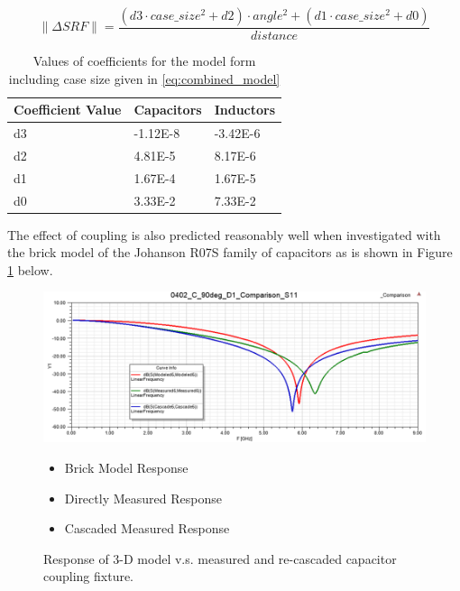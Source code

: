 \documentclass[12pt]{usfcoe}
\begin{document}
    \begin{equation}\label{eq:combined_model}
   \|\Delta SRF\| = \frac{\left( d3\cdot case\_size^2 + d2 \right)\cdot angle^2 + \left( d1\cdot case\_size^2 + d0 \right)}{distance}
    \end{equation}
	
    \begin{table}[H]
        \begin{center}
            \begin{tabular}{|l|l|l|}
            \hline
            Coefficient Value & Capacitors & Inductors \\
            \hline
             d3 & -1.12E-8 & -3.42E-6 \\
            \hline
            d2 & 4.81E-5 & 8.17E-6  \\
            \hline
            d1 & 1.67E-4 & 1.67E-5 \\
            \hline
            d0 & 3.33E-2 & 7.33E-2 \\
            \hline
            \end{tabular}
            \label{tbl:model_coeffs}
        	\caption{Values of coefficients for the model form including case size given in \ref{eq:combined_model}}
        \end{center}
	\end{table}   
	
    The effect of coupling is also predicted reasonably well when investigated with the brick model of the Johanson R07S family of capacitors as is shown in Figure \ref{fig:anova_3d} below.
	    
    \begin{figure}[H]
		\begin{center}
        	\includegraphics[width=\textwidth]{images/ANOVA/3D_model_fit.png} 
            \vspace{-\topsep}
            \begin{itemize}
                \centering
                \setlength{\parskip}{0pt}
                \setlength{\itemsep}{0pt} 
                \color{red}
                \item Brick Model Response
                \color{green}
                \item Directly Measured Response
                \color{blue}
                \item Cascaded Measured Response
            \end{itemize}
            \vspace*{-9pt}
			\caption{Response of 3-D model v.s. measured and re-cascaded capacitor coupling fixture.}
			\label{fig:anova_3d}
		\end{center}
    \end{figure}    
\end{document}
